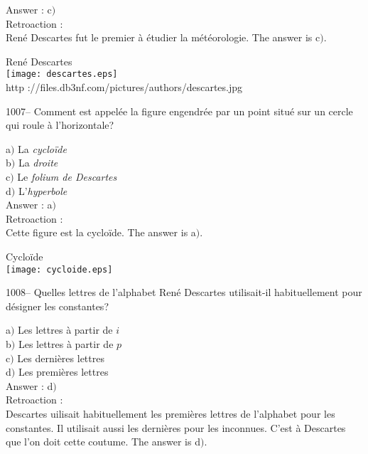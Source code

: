 ﻿\documentclass[letterpaper, 12pt]{article}
\begin{document}
Answer : c$)$\\

Retroaction : \\
Ren\'e Descartes fut le premier \`a \'etudier la m\'et\'eorologie.
The answer is c$)$.\\

        \begin{center}
        Ren\'e Descartes\\
    \texttt{[image: descartes.eps]}\\
        {\footnotesize http
://files.db3nf.com/pictures/authors/descartes.jpg}
    \end{center}

1007-- Comment est appel\'ee la figure engendr\'ee par un point situ\'e sur
un cercle qui roule \`a l'horizontale?

a$)$ La {\sl cyclo\"ide} \\
b$)$ La {\sl droite} \\
c$)$ Le {\sl folium de Descartes} \\
d$)$ L'{\sl hyperbole}\\

Answer : a$)$\\

Retroaction : \\
Cette figure est la cyclo\"ide.
The answer is a$)$.\\

        \begin{center}
       Cyclo\"ide \\
    \texttt{[image: cycloide.eps]}\\
    \end{center}

1008-- Quelles lettres de l'alphabet Ren\'e Descartes utilisait-il
habituellement pour d\'esigner les constantes?

a$)$ Les lettres \`a partir de $i$ \\
b$)$ Les lettres \`a partir de $p$ \\
c$)$ Les derni\`eres lettres \\
d$)$ Les premi\`eres lettres\\

Answer : d$)$\\

Retroaction : \\
Descartes uilisait habituellement les premi\`eres lettres de
l'alphabet pour les constantes. Il utilisait aussi les derni\`eres
pour les inconnues. C'est \`a Descartes que l'on doit cette coutume.
The answer is d$)$.\\
\end{document}
